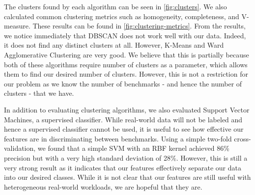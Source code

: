 The clusters found by each algorithm can be seen in
\ref{fig:clusters}. We also calculated common clustering metrics such
as homogeneity, completeness, and V-measure. These results can be
found in \ref{fig:clustering-metrics}. From the results, we notice
immediately that DBSCAN does not work well with our data. Indeed, it
does not find any distinct clusters at all. However, K-Means and Ward
Agglomerative Clustering are very good. We believe that this is
partially because both of these algorithms require number of clusters
as a parameter, which allows them to find our desired number of
clusters. However, this is not a restriction for our problem as we
know the number of benchmarks - and hence the number of clusters -
that we have.

In addition to evaluating clustering algorithms, we also evaluated
Support Vector Machines, a supervised classifier. While real-world
data will not be labeled and hence a supervised classifier cannot be
used, it is useful to see how effective our features are in
discriminating between benchmarks. Using a simple two-fold
cross-validation, we found that a simple SVM with an RBF kernel
achieved 86\% precision but with a very high standard deviation of
28\%. However, this is still a very strong result as it indicates that
our features effectively separate our data into our desired
classes. While it is not clear that our features are still useful with
heterogeneous real-world workloads, we are hopeful that they are.
